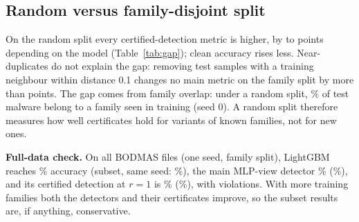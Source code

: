 \begin{table}[!htbp]
\centering\small
\caption{The six pre-registered comparisons on the family split: paired difference per seed (A minus B, percentage points), 95\% $t$-interval, paired $t$-test and Holm-corrected $p$-value.}\label{tab:cmp}
\resizebox{\textwidth}{!}{}
\end{table}

\subsection{Random versus family-disjoint split}\label{sec:gap}
On the random split every certified-detection metric is higher, by \RandFamGapMin{} to \RandFamGapMax{} points depending on the model (Table~\ref{tab:gap}); clean accuracy rises less. %
Near-duplicates do not explain the gap: removing test samples with a training neighbour within distance 0.1 changes no main metric on the family split by more than \NearTwinMaxShift{} points. The gap comes from family overlap: under a random split, \LeakRandFamOverlap\% of test malware belong to a family seen in training (seed 0). A random split therefore measures how well certificates hold for variants of known families, not for new ones.

\textbf{Full-data check.} On all \ResFullN{} BODMAS files (one seed, family split), LightGBM reaches \ResFullAccLgbm\% accuracy (subset, same seed: \ResSubAccLgbm\%), the main MLP-view detector \ResFullAccAblMain\% (\ResSubAccAblMain\%), and its certified detection at $r=1$ is \ResFullCertAblMain\% (\ResSubCertAblMain\%), with \ResFullViolations{} violations. With more training families both the detectors and their certificates improve, so the subset results are, if anything, conservative. %

\begin{table}[!htbp]
\centering\small
\caption{Random split (\NSeedsRand{} seeds) against family-disjoint split (\NSeedsFam{} seeds): mean [95\% interval] and the gap in points.}\label{tab:gap}
\resizebox{\textwidth}{!}{}
\end{table}

